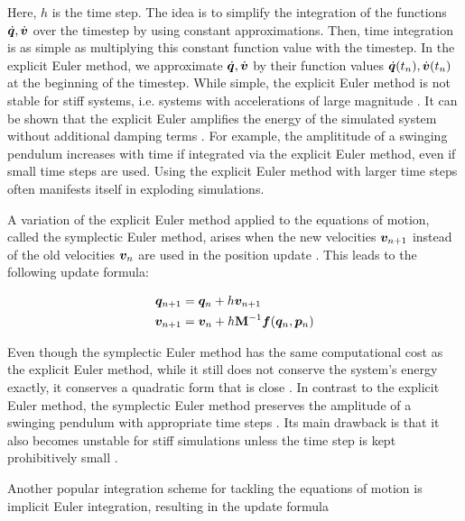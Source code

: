 \noindent Here, $h$ is the time step. The idea is to simplify the integration of the functions $\dot{\bm{q}}, \dot{\bm{v}}$ over the timestep by 
using constant approximations. 
Then, time integration is as simple as multiplying this constant function value with the timestep. In the explicit Euler method, we 
approximate $\dot{\bm{q}}, \dot{\bm{v}}$ by their function values $\dot{\bm{q}}(t_n), \dot{\bm{v}}(t_n)$ at the beginning of the timestep.
While simple, the explicit Euler method is not stable for stiff systems, i.e. systems with accelerations of large magnitude 
\cite{chapra2005}. It can be shown that the explicit Euler amplifies the energy of the simulated system without additional damping terms
\cite{stern2006}. For example, the amplititude of a swinging pendulum increases with time if integrated via the explicit Euler method, 
even if small time steps are used. Using the explicit Euler method with larger time steps often manifests itself in exploding simulations. 

A variation of the explicit Euler method applied to the equations of motion, called the symplectic Euler method, arises when the new 
velocities $\bm{v}_{n+1}$ instead of the old velocities $\bm{v}_n$ are used in the position update \cite{stern2006}. This leads to 
the following update formula:

\begin{align}
    \begin{split}\label{eq:symplectic-euler}
        \bm{q}_{n+1} &= \bm{q}_n + h\bm{v}_{n+1}\\
        \bm{v}_{n+1} &= \bm{v}_n + h\mathbf{M}^{-1}\bm{f}(\bm{q}_n, \bm{p}_n)
    \end{split}
\end{align}

\noindent Even though the symplectic Euler method has the same computational cost as the explicit Euler method, while it still does not conserve
the system's energy exactly, it conserves a quadratic form that is close \cite{servin2006}. In contrast to the explicit Euler method, the 
symplectic Euler method preserves the amplitude of a swinging pendulum with appropriate time steps \cite{stern2006}. Its main drawback 
is that it also becomes unstable for stiff simulations unless the time step is kept prohibitively small \cite{servin2006}. 

Another popular integration scheme for tackling the equations of motion is implicit Euler integration, resulting in the update formula

